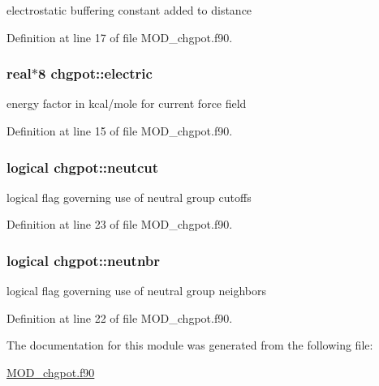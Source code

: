 electrostatic buffering constant added to distance 



Definition at line 17 of file M\-O\-D\-\_\-chgpot.\-f90.

\hypertarget{classchgpot_acc69d668f4908e5bdaad84b76861051f}{
\subsubsection[{electric}]{\setlength{\rightskip}{0pt plus 5cm}real$\ast$8 chgpot\-::electric}}\label{classchgpot_acc69d668f4908e5bdaad84b76861051f}


energy factor in kcal/mole for current force field 



Definition at line 15 of file M\-O\-D\-\_\-chgpot.\-f90.

\hypertarget{classchgpot_aef4979f868b0e9e09f157aea1765afd6}{
\subsubsection[{neutcut}]{\setlength{\rightskip}{0pt plus 5cm}logical chgpot\-::neutcut}}\label{classchgpot_aef4979f868b0e9e09f157aea1765afd6}


logical flag governing use of neutral group cutoffs 



Definition at line 23 of file M\-O\-D\-\_\-chgpot.\-f90.

\hypertarget{classchgpot_aaef3345c088c026e3d4f3d94f8e496a1}{
\subsubsection[{neutnbr}]{\setlength{\rightskip}{0pt plus 5cm}logical chgpot\-::neutnbr}}\label{classchgpot_aaef3345c088c026e3d4f3d94f8e496a1}


logical flag governing use of neutral group neighbors 



Definition at line 22 of file M\-O\-D\-\_\-chgpot.\-f90.



The documentation for this module was generated from the following file\-:\begin{DoxyCompactItemize}
\item 
\hyperlink{MOD__chgpot_8f90}{M\-O\-D\-\_\-chgpot.\-f90}\end{DoxyCompactItemize}

